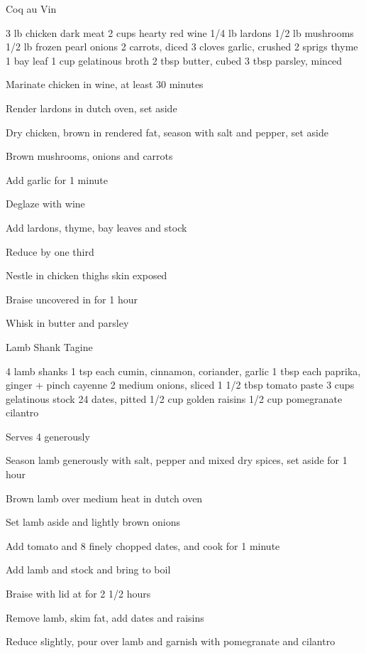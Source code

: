 \begin{denserecipe}{Coq au Vin}{}
\begin{ingredients}
3 lb chicken dark meat
2 cups hearty red wine
1/4 lb lardons
1/2 lb mushrooms
1/2 lb frozen pearl onions
2 carrots, diced
3 cloves garlic, crushed
2 sprigs thyme
1 bay leaf
1 cup gelatinous broth
2 tbsp butter, cubed
3 tbsp parsley, minced
\end{ingredients}
\nextcolumn
\begin{steps}
    \item Marinate chicken in wine, at least 30 minutes
    \item Render lardons in dutch oven, set aside
    \item Dry chicken, brown in rendered fat, season with salt and pepper, set aside
    \item Brown mushrooms, onions and carrots
    \item Add garlic for 1 minute
    \item Deglaze with wine
    \item Add lardons, thyme, bay leaves and stock
    \item Reduce by one third
    \item Nestle in chicken thighs skin exposed
    \item Braise uncovered in  for 1 hour
    \item Whisk in butter and parsley
\end{steps}
\end{denserecipe}

\begin{denserecipe}{Lamb Shank Tagine}{}
\begin{ingredients}
4 lamb shanks
1 tsp each cumin, cinnamon, coriander, garlic
1 tbsp each paprika, \mbox{ginger} + pinch cayenne
2 medium onions, sliced
1 1/2 tbsp tomato paste
3 cups gelatinous stock
24 dates, pitted
1/2 cup golden raisins
1/2 cup pomegranate
cilantro
\end{ingredients}
\nextcolumn
Serves 4 generously
\begin{steps}
    \item Season lamb generously with salt, pepper and mixed dry spices, set aside for 1 hour
    \item Brown lamb over medium heat in dutch oven
    \item Set lamb aside and lightly brown onions
    \item Add tomato and 8 finely chopped dates, and cook for 1 minute
    \item Add lamb and stock and bring to boil
    \item Braise with lid at  for 2 1/2 hours
    \item Remove lamb, skim fat, add dates and raisins
    \item Reduce slightly, pour over lamb and garnish with pomegranate and cilantro
\end{steps}
\end{denserecipe}

